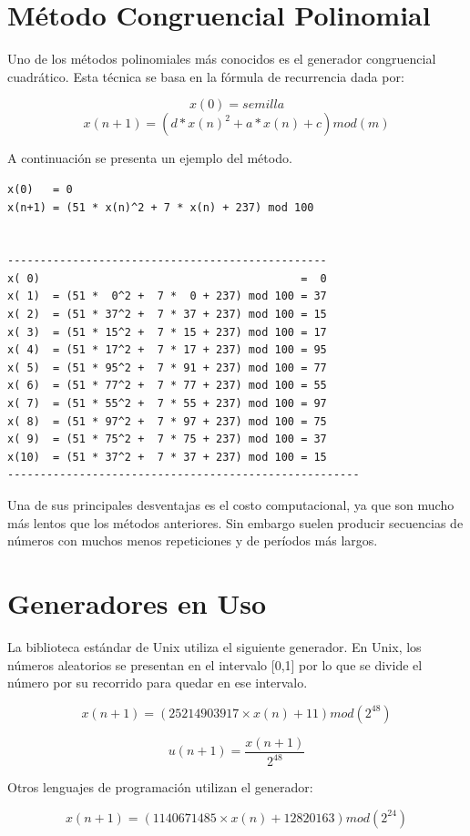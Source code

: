 \section{Método Congruencial Polinomial}


Uno de los métodos polinomiales más conocidos es el generador congruencial cuadrático. Esta técnica se basa en la fórmula de recurrencia dada por:

$$x(0)   = semilla$$
$$x(n+1) = (d * x(n)^2 + a * x(n) + c) mod (m)$$


A continuación se presenta un ejemplo del método.
\begin{verbatim}
x(0)   = 0
x(n+1) = (51 * x(n)^2 + 7 * x(n) + 237) mod 100


-------------------------------------------------
x( 0)                                        =  0
x( 1)  = (51 *  0^2 +  7 *  0 + 237) mod 100 = 37
x( 2)  = (51 * 37^2 +  7 * 37 + 237) mod 100 = 15
x( 3)  = (51 * 15^2 +  7 * 15 + 237) mod 100 = 17
x( 4)  = (51 * 17^2 +  7 * 17 + 237) mod 100 = 95
x( 5)  = (51 * 95^2 +  7 * 91 + 237) mod 100 = 77
x( 6)  = (51 * 77^2 +  7 * 77 + 237) mod 100 = 55
x( 7)  = (51 * 55^2 +  7 * 55 + 237) mod 100 = 97
x( 8)  = (51 * 97^2 +  7 * 97 + 237) mod 100 = 75
x( 9)  = (51 * 75^2 +  7 * 75 + 237) mod 100 = 37
x(10)  = (51 * 37^2 +  7 * 37 + 237) mod 100 = 15
------------------------------------------------------
\end{verbatim}

Una de sus principales desventajas es el costo computacional, ya que son mucho más lentos que los métodos anteriores. Sin embargo suelen producir secuencias de números con muchos menos repeticiones y de períodos más largos.



\section{Generadores en Uso}

La biblioteca estándar de Unix utiliza el siguiente generador. En Unix, los números aleatorios se presentan en el intervalo [0,1] por lo que se divide el número por su recorrido para quedar en ese intervalo.

$$x(n+1) = (25214903917 \times x(n) + 11) mod (2^{48})$$

$$u(n+1) = \frac{x(n+1)}{2^{48}}$$


Otros lenguajes de programación utilizan el generador:

$$x(n+1) = (1140671485 \times x(n) + 12820163) mod (2^{24})$$

